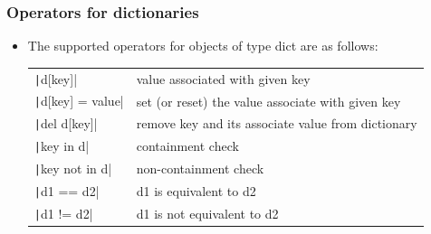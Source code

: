 \begin{frame}
    \frametitle{Operators for dictionaries}

    \begin{itemize}
        \item The supported operators for objects of type dict are as follows:
              \begin{table}[htbp]
                  \centering
                  \begin{tabular}{ll}
                      \texttt|d[key]|         & value associated with given key                    \\
                      \texttt|d[key] = value| & set (or reset) the value associate with given key  \\
                      \texttt|del d[key]|     & remove key and its associate value from dictionary \\
                      \texttt|key in d|       & containment check                                  \\
                      \texttt|key not in d|   & non-containment check                              \\
                      \texttt|d1 == d2|       & d1 is equivalent to d2                             \\
                      \texttt|d1 != d2|       & d1 is not equivalent to d2                         \\
                  \end{tabular}%
              \end{table}%

    \end{itemize}

\end{frame}

